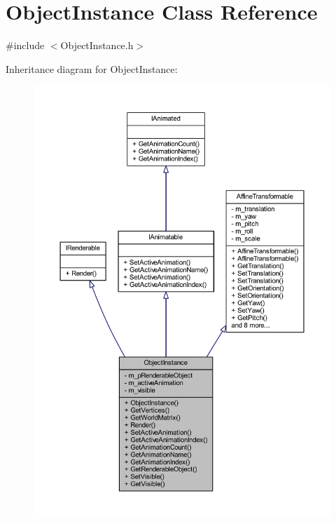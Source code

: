 \hypertarget{class_object_instance}{}\section{Object\+Instance Class Reference}
\label{class_object_instance}


{\ttfamily \#include $<$Object\+Instance.\+h$>$}



Inheritance diagram for Object\+Instance\+:\nopagebreak
\begin{figure}[H]
\begin{center}
\leavevmode
\includegraphics[width=350pt]{class_object_instance__inherit__graph}
\end{center}
\end{figure}


